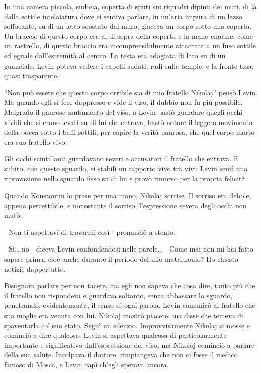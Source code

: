 In una camera piccola, sudicia, coperta di sputi sui riquadri dipinti dei muri, di là dalla sottile intelaiatura dove si sentiva parlare, in un'aria impura di un lezzo soffocante, su di un letto scostato dal muro, giaceva un corpo sotto una coperta. Un braccio di questo corpo era al di sopra della coperta e la mano enorme, come un rastrello, di questo braccio era incomprensibilmente attaccata a un fuso sottile ed eguale dall'estremità al centro. La testa era adagiata di lato su di un guanciale. Levin poteva vedere i capelli sudati, radi sulle tempie, e la fronte tesa, quasi trasparente. 

``Non può essere che questo corpo orribile sia di mio fratello Nikolaj'' pensò Levin. Ma quando egli si fece dappresso e vide il viso, il dubbio non fu più possibile. Malgrado il pauroso mutamento del viso, a Levin bastò guardare quegli occhi vividi che si erano levati su di lui che entrava, bastò notare il leggero movimento della bocca sotto i baffi sottili, per capire la verità paurosa, che quel corpo morto era suo fratello vivo. 

Gli occhi scintillanti guardavano severi e accusatori il fratello che entrava. E subito, con questo sguardo, si stabilì un rapporto vivo tra vivi. Levin sentì una riprovazione nello sguardo fisso su di lui e provò rimorso per la propria felicità. 

Quando Konstantin lo prese per una mano, Nikolaj sorrise. Il sorriso era debole, appena percettibile, e nonostante il sorriso, l'espressione severa degli occhi non mutò. 

- Non ti aspettavi di trovarmi così - pronunciò a stento. 

- Sì\ldots{} no - diceva Levin confondendosi nelle parole\ldots{} - Come mai non mi hai fatto sapere prima, cioè anche durante il periodo del mio matrimonio? Ho chiesto notizie dappertutto. 

Bisognava parlare per non tacere, ma egli non sapeva che cosa dire, tanto più che il fratello non rispondeva e guardava soltanto, senza abbassare lo sguardo, penetrando, evidentemente, il senso di ogni parola. Levin comunicò al fratello che sua moglie era venuta con lui. Nikolaj mostrò piacere, ma disse che temeva di spaventarla col suo stato. Seguì un silenzio. Improvvisamente Nikolaj si mosse e cominciò a dire qualcosa. Levin si aspettava qualcosa di particolarmente importante e significativo dall'espressione del viso, ma Nikolaj cominciò a parlare della sua salute. Incolpava il dottore, rimpiangeva che non ci fosse il medico famoso di Mosca, e Levin capì ch'egli sperava ancora. 

